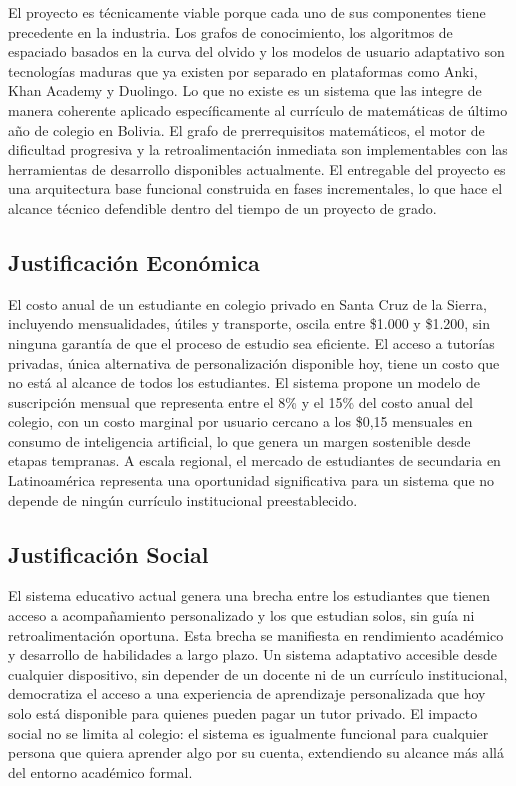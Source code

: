 \documentclass{univalle-perfil}
\begin{document}
El proyecto es técnicamente viable porque cada uno de sus componentes tiene precedente en la industria. Los grafos de conocimiento, los algoritmos de espaciado basados en la curva del olvido y los modelos de usuario adaptativo son tecnologías maduras que ya existen por separado en plataformas como Anki, Khan Academy y Duolingo. Lo que no existe es un sistema que las integre de manera coherente aplicado específicamente al currículo de matemáticas de último año de colegio en Bolivia. El grafo de prerrequisitos matemáticos, el motor de dificultad progresiva y la retroalimentación inmediata son implementables con las herramientas de desarrollo disponibles actualmente. El entregable del proyecto es una arquitectura base funcional construida en fases incrementales, lo que hace el alcance técnico defendible dentro del tiempo de un proyecto de grado.

\subsection{Justificación Económica}

El costo anual de un estudiante en colegio privado en Santa Cruz de la Sierra, incluyendo mensualidades, útiles y transporte, oscila entre \$1.000 y \$1.200, sin ninguna garantía de que el proceso de estudio sea eficiente. El acceso a tutorías privadas, única alternativa de personalización disponible hoy, tiene un costo que no está al alcance de todos los estudiantes. El sistema propone un modelo de suscripción mensual que representa entre el 8\% y el 15\% del costo anual del colegio, con un costo marginal por usuario cercano a los \$0,15 mensuales en consumo de inteligencia artificial, lo que genera un margen sostenible desde etapas tempranas. A escala regional, el mercado de estudiantes de secundaria en Latinoamérica representa una oportunidad significativa para un sistema que no depende de ningún currículo institucional preestablecido.

\subsection{Justificación Social}

El sistema educativo actual genera una brecha entre los estudiantes que tienen acceso a acompañamiento personalizado y los que estudian solos, sin guía ni retroalimentación oportuna. Esta brecha se manifiesta en rendimiento académico y desarrollo de habilidades a largo plazo. Un sistema adaptativo accesible desde cualquier dispositivo, sin depender de un docente ni de un currículo institucional, democratiza el acceso a una experiencia de aprendizaje personalizada que hoy solo está disponible para quienes pueden pagar un tutor privado. El impacto social no se limita al colegio: el sistema es igualmente funcional para cualquier persona que quiera aprender algo por su cuenta, extendiendo su alcance más allá del entorno académico formal.
\end{document}
